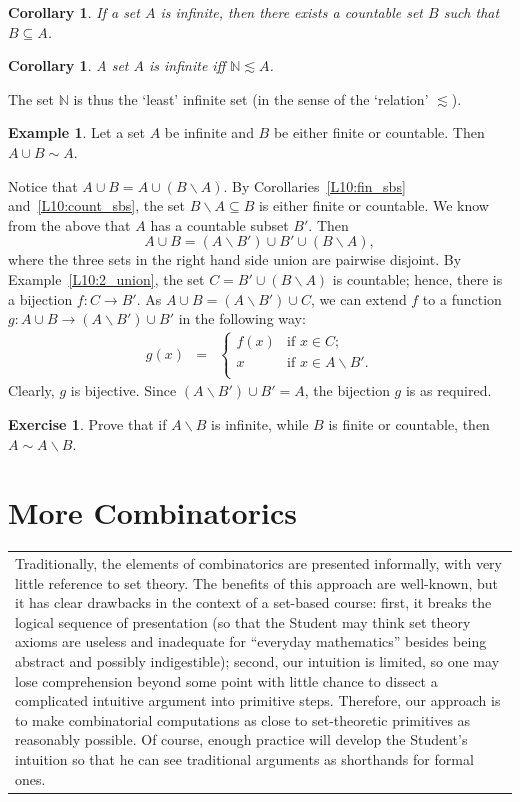 \documentclass[12pt,notitlepage]{article}
\theoremstyle{plain}
\newtheorem{corr}[thm]{Corollary}
\theoremstyle{definition}
\newtheorem{exc}[thm]{Exercise}
\newtheorem{exm}[thm]{Example}
\theoremstyle{plain}
\newcommand{\N}{\mathbb{N}}
\newcommand{\sbs}{\subseteq}
\renewcommand{\setminus}{\smallsetminus}
\newcommand{\1}{\mathbf{1}}
\newcommand{\0}{\mathbf{0}}
\newcommand{\mcomm}[1]{
\medskip\noindent\begin{tabular}{| l}
\parbox{0.99\textwidth}{{\small
#1 }}\end{tabular}
\smallskip}
\begin{document}
\begin{corr}
If a set $A$ is infinite, then there exists a countable set $B$ such that $B \sbs A$.
\end{corr}

\begin{corr}\label{L10:min_inf_corr}
A set $A$ is infinite iff $\N \lesssim A$.
\end{corr}
\noindent The set $\N$ is thus the `least' infinite set (in the sense of the `relation' ${\lesssim}$).

\begin{exm}
Let a set $A$ be infinite and $B$ be either finite or countable. Then $A \cup B \sim A$.

Notice that $A \cup B = A \cup (B \setminus A)$. By Corollaries~\ref{L10:fin_sbs} and~\ref{L10:count_sbs}, the set $B \setminus A \sbs B$ is either finite or countable. We know from the above that $A$ has a countable subset $B'$. Then
$$A \cup B = (A \setminus B') \cup B' \cup (B \setminus A),$$
where the three sets in the right hand side union are pairwise disjoint. By Example~\ref{L10:2_union}, the set $C = B' \cup (B \setminus A)$ is countable; hence, there is a bijection $f\colon C \to B'$. As $A \cup B = (A \setminus B') \cup C$, we can extend $f$ to a function $g\colon A \cup B \to (A \setminus B') \cup B'$ in the following way:
$$
\begin{array}{rcll}
g(x) &=& \begin{cases}
			f(x)&\mbox{if } x \in C;\\
			x&\mbox{if } x \in A \setminus B'.\\
		\end{cases}
\end{array}
$$
Clearly, $g$ is bijective. Since $(A \setminus B') \cup B' = A$, the bijection $g$ is as required.
\end{exm}

\begin{exc}
Prove that if $A \setminus B$ is infinite, while $B$ is finite or countable, then $A \sim A \setminus B$.
\end{exc}

\newpage
\section{More Combinatorics}
\mcomm{Traditionally, the elements of combinatorics are presented informally, with very little reference to set theory. The benefits of this approach are well-known, but it has clear drawbacks in the context of a set-based course: first, it breaks the logical sequence of presentation (so that the Student may think set theory axioms are useless and inadequate for ``everyday mathematics'' besides being abstract and possibly indigestible); second, our intuition is limited, so one may lose comprehension beyond some point with little chance to dissect a complicated intuitive argument into primitive steps. Therefore, our approach is to make combinatorial computations as close to set-theoretic primitives as reasonably possible. Of course, enough practice will develop the Student's intuition so that he can see traditional arguments as shorthands for formal ones.}
\end{document}
